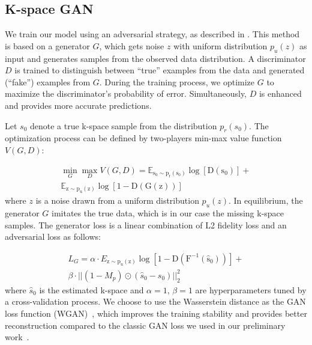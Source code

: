 \documentclass[10pt,journal,compsoc]{IEEEtran}
\begin{document}
\subsection{K-space GAN}
We train our model using an adversarial strategy, as described in \cite{goodfellow2014generative,radford2015unsupervised}. 
This method is based on a generator $G$, which gets noise \textbf{$z$ }with uniform distribution \textbf{$p_{u}\left(z\right)$} as input and generates samples from the observed data distribution. A discriminator $D$ is trained to distinguish between ``true'' examples from the data and generated (``fake'') examples from $G.$ During the training process, we optimize $G$ to maximize the discriminator's probability of error. Simultaneously, $D$ is enhanced and provides more accurate predictions.

Let $s_{0}$ denote a true k-space sample from the distribution $p_{r}\left(s_{0}\right)$. The optimization process can be defined by two-players min-max value function $V(G,D)$:

\begin{equation}
\begin{split}
\min_{G}\max_{D}V(G,D) = \mathbb{E_{\mathrm{s_{0}\sim p_{r}\left(s_{0}\right)}}\mathrm{\log\left[D\left(s_{0}\right)\right]}}+
\\
\mathbb{E_{\mathrm{z\sim p_{u}\left(z\right)}}\mathrm{\log\left[1-D\left(G(z)\right)\right]}}
\end{split}
\end{equation}
where $z$ is a noise drawn from a uniform distribution $p_{u}\left(z\right)$.
In equilibrium, the generator $G$ imitates the true data, which is in our case the missing k-space samples. The generator loss is a linear combination of L2 fidelity loss and an adversarial loss as follows:

\begin{equation}
\begin{aligned}L_{G}=\alpha\cdot E_{\mathrm{z\sim p_{u}\left(z\right)}}\mathrm{\log\left[1-D\left(F^{-1}\left(\hat{s}_{0}\right)\right)\right]}+\\
\beta\cdot||\left(1-M_{p}\right)\odot\left(\hat{s}_{0}-s_{0}\right)||_{2}^{2}
\end{aligned}
\end{equation}
where $\hat{s}_{0}$ is the estimated k-space and $\alpha=1,\,\beta=1$ are hyperparameters tuned by a cross-validation process.
We choose to use the Wasserstein distance as the GAN loss function (WGAN)~\cite{arjovsky2017wasserstein}, which improves the training stability and provides better reconstruction compared to the classic GAN loss we used in our preliminary work~\cite{shitrit2017accelerated}.
\end{document}
